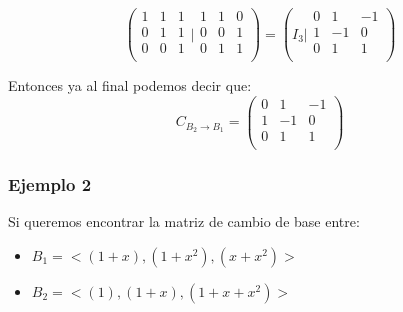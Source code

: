 \documentclass[12pt]{report}							    %
\begin{document}
        \begin{equation*}
            \left(
            \begin{matrix}
                1 & 1 & 1 \\
                0 & 1 & 1 \\
                0 & 0 & 1 \\
            \end{matrix}
            \Big|
            \begin{matrix}
                1 & 1 & 0 \\
                0 & 0 & 1 \\
                0 & 1 & 1 \\
            \end{matrix}
            \right)
            = \left(
            I_3
            \big|
            \begin{matrix}
                0 & 1 & -1 \\
                1 & -1 & 0 \\
                0 & 1 & 1 \\
            \end{matrix}
            \right)
        \end{equation*}

        Entonces ya al final podemos decir que:
        \begin{equation*}
            C_{B_2 \to B_1} =
            \begin{pmatrix}
                0 & 1 & -1 \\
                1 & -1 & 0 \\
                0 & 1 & 1 \\
            \end{pmatrix}
        \end{equation*}



        \subsubsection{Ejemplo 2}

        Si queremos encontrar la matriz de cambio de base entre:
        \begin{itemize}
            \item $B_1 = < (1+x), (1+x^2), (x+x^2) >$ 
            \item $B_2 = < (1), (1+x), (1+x+x^2) >$ 
        \end{itemize}
\end{document}
